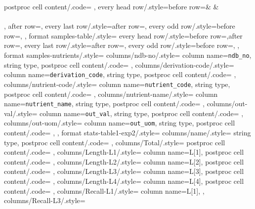 {{{            postproc cell content/.code={}
        },
        every head row/.style={before row=\toprule &  & \\
        \cmidrule(lr){2-4} \cmidrule(lr){5-6}\\, after row=\midrule},
        every last row/.style={after row=\bottomrule},
        every odd row/.style={before row={}},
    },
    format samples-table/.style={
        every head row/.style={before row=\toprule,after row=\midrule},
        every last row/.style={after row=\bottomrule},
        every odd row/.style={before row={}},
    },
    format samples-nutrients/.style={
        columns/ndb-no/.style={
            column name={\texttt{ndb\_no}},
            string type,
            postproc cell content/.code={}
        },
        columns/derivation-code/.style={
            column name={\texttt{derivation\_code}},
            string type,
            postproc cell content/.code={}
        },
        columns/nutrient-code/.style={
            column name={\texttt{nutrient\_code}},
            string type,
            postproc cell content/.code={}
        },
        columns/nutrient-name/.style={
            column name={\texttt{nutrient\_name}},
            string type,
            postproc cell content/.code={}
        },
        columns/out-val/.style={
            column name={\texttt{out\_val}},
            string type,
            postproc cell content/.code={}
        },
        columns/out-uom/.style={
            column name={\texttt{out\_uom}},
            string type,
            postproc cell content/.code={}
        },
    },
    format stats-table1-exp2/.style={
        columns/name/.style={
            string type,
            postproc cell content/.code={}
        },
        columns/Total/.style={
            postproc cell content/.code={}
        },
        columns/Length-L1/.style={
            column name={L[1]},
            postproc cell content/.code={}
        },
        columns/Length-L2/.style={
            column name={L[2]},
            postproc cell content/.code={}
        },
        columns/Length-L3/.style={
            column name={L[3]},
            postproc cell content/.code={}
        },
        columns/Length-L4/.style={
            column name={L[4]},
            postproc cell content/.code={}
        },
        columns/Recall-L1/.style={
            column name={L[1]},
        },
        columns/Recall-L3/.style={
}}}
